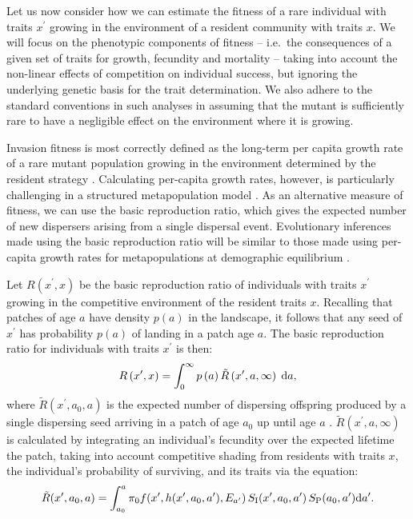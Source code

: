 \documentclass[10pt,twoside]{article}
\begin{document}
Let us now consider how we can estimate the fitness of a rare individual
with traits \(x^\prime\) growing in the environment of a resident
community with traits \(x\). We will focus on the phenotypic components
of fitness -- i.e.~the consequences of a given set of traits for growth,
fecundity and mortality -- taking into account the non-linear effects of
competition on individual success, but ignoring the underlying genetic
basis for the trait determination. We also adhere to the standard
conventions in such analyses in assuming that the mutant is sufficiently
rare to have a negligible effect on the environment where it is growing.

Invasion fitness is most correctly defined as the long-term per capita
growth rate of a rare mutant population growing in the environment
determined by the resident strategy \citep{Metz-1992}. Calculating
per-capita growth rates, however, is particularly challenging in a
structured metapopulation model \citep{Gyllenberg-2001, Metz-2001}. As
an alternative measure of fitness, we can use the basic reproduction
ratio, which gives the expected number of new dispersers arising from a
single dispersal event. Evolutionary inferences made using the basic
reproduction ratio will be similar to those made using per-capita growth
rates for metapopulations at demographic equilibrium
\citep{Gyllenberg-2001, Metz-2001}.

Let \(R\left(x^\prime,x\right)\) be the basic reproduction ratio of
individuals with traits \(x^\prime\) growing in the competitive
environment of the resident traits \(x\). Recalling that patches of age
\(a\) have density \(p(a)\) in the landscape, it follows that any seed
of \(x^\prime\) has probability \(p(a)\) of landing in a patch age
\(a\). The basic reproduction ratio for individuals with traits
\(x^\prime\) is then:
\begin{equation} \label{eq:InvFit}
  R\left(x^\prime,x\right)=\int _0^{\infty }p\left(a\right)\tilde{R}\left(x^\prime,a, \infty \right)\; {\rm d}a ,
\end{equation}
where \(\tilde{R}\left(x^\prime,a_0,a \right)\) is the expected number
of dispersing offspring produced by a single dispersing seed arriving in
a patch of age \(a_0\) up until age \(a\)
\citep{Gyllenberg-2001, Metz-2001}.
\(\tilde{R}\left(x^\prime,a,\infty\right)\) is calculated by integrating
an individual's fecundity over the expected lifetime the patch, taking
into account competitive shading from residents with traits \(x\), the
individual's probability of surviving, and its traits via the equation:
\begin{equation} \label{eq:tildeR}
  \tilde{R}(x^\prime, a_0, a) =\int_{a_0}^{a}  \pi_0f(x^\prime, h(x^\prime, a_0, a^\prime), E_{a^\prime}) \, S_{\rm I} (x^\prime, a_0, a^\prime) \, S_{\rm P} (a_0,a^\prime)  {\rm d} a^\prime.
\end{equation}
\end{document}

